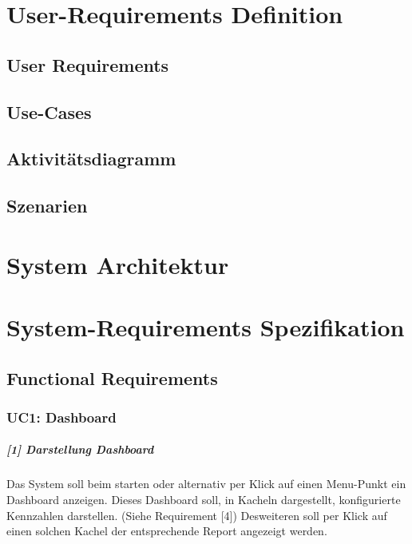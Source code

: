 \documentclass[a4paper]{scrreprt}
\begin{document}
\chapter{User-Requirements Definition}


\section{User Requirements}



\section{Use-Cases}



\section{Aktivitätsdiagramm}


\section{Szenarien}





\chapter{System Architektur}




\chapter{System-Requirements Spezifikation}

\section{Functional Requirements}
\subsection{UC1: Dashboard}
\paragraph{[1] Darstellung Dashboard}
Das System soll beim starten oder alternativ per Klick auf einen Menu-Punkt ein Dashboard anzeigen. Dieses Dashboard soll, in Kacheln dargestellt, konfigurierte Kennzahlen darstellen. (Siehe Requirement [4]) Desweiteren soll per Klick auf einen solchen Kachel der entsprechende Report angezeigt werden. 
	
\end{document}
